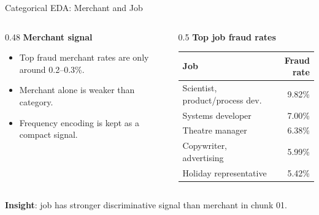 \documentclass{beamer}
\begin{document}
\begin{frame}{Categorical EDA: Merchant and Job}
    \begin{columns}[onlytextwidth, t]
        \begin{column}{0.48\textwidth}
            \textbf{Merchant signal}
            \begin{itemize}
                \item Top fraud merchant rates are only around 0.2--0.3\%.
                \item Merchant alone is weaker than category.
                \item Frequency encoding is kept as a compact signal.
            \end{itemize}
        \end{column}
        \begin{column}{0.5\textwidth}
            \textbf{Top job fraud rates}
            \begin{table}
                \centering
                \tiny
                \begin{tabular}{lr}
                    \toprule
                    \textbf{Job} & \textbf{Fraud rate} \\
                    \midrule
                    Scientist, product/process dev. & 9.82\% \\
                    Systems developer & 7.00\% \\
                    Theatre manager & 6.38\% \\
                    Copywriter, advertising & 5.99\% \\
                    Holiday representative & 5.42\% \\
                    \bottomrule
                \end{tabular}
            \end{table}
        \end{column}
    \end{columns}

    \vspace{0.2cm}
    \textbf{Insight}: job has stronger discriminative signal than merchant in chunk 01.
\end{frame}
\end{document}
